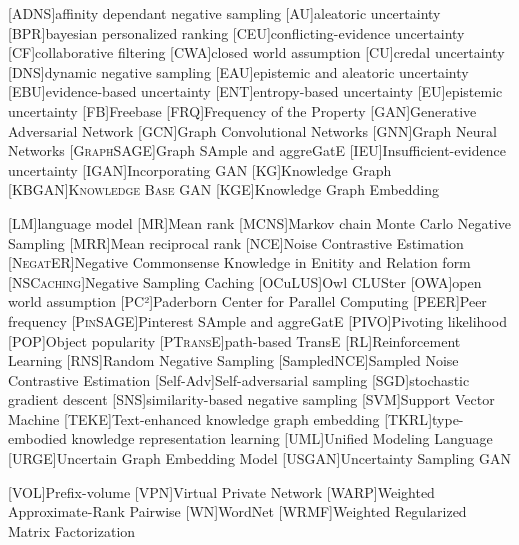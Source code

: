 \begin{acronym}[ECU]
[\textsc{ADNS}]{affinity dependant negative sampling}
[AU]{aleatoric uncertainty}
[BPR]{bayesian personalized ranking}
[CEU]{conflicting-evidence uncertainty}
[CF]{collaborative filtering}
[CWA]{closed world assumption}
[CU]{credal uncertainty}
[DNS]{dynamic negative sampling}
[EAU]{epistemic and aleatoric uncertainty}
[EBU]{evidence-based uncertainty}
[ENT]{entropy-based uncertainty}
[EU]{epistemic uncertainty}
[\textsc{FB}]{Freebase}
[\textsc{FRQ}]{Frequency of the Property}
[GAN]{Generative Adversarial Network}
[GCN]{Graph Convolutional Networks}
[GNN]{Graph Neural Networks}
[\textsc{GraphSAGE}]{Graph SAmple and aggreGatE}
[IEU]{Insufficient-evidence uncertainty}
[\textsc{IGAN}]{Incorporating GAN}
[KG]{Knowledge Graph}
[\textsc{KBGAN}]{\textsc{Knowledge Base GAN}}
[KGE]{Knowledge Graph Embedding}

[LM]{language model}
[MR]{Mean rank}
[\textsc{MCNS}]{Markov chain Monte Carlo Negative Sampling}
[MRR]{Mean reciprocal rank}
[NCE]{Noise Contrastive Estimation}
[\textsc{NegatER}]{Negative Commonsense Knowledge in Enitity and Relation form}
[\textsc{NSCaching}]{Negative Sampling Caching}
[OCuLUS]{Owl CLUSter}
[OWA]{open world assumption}
[PC²]{Paderborn Center for Parallel Computing}
[\textsc{PEER}]{Peer frequency}
[\textsc{PinSAGE}]{Pinterest SAmple and aggreGatE}
[\textsc{PIVO}]{Pivoting likelihood}
[\textsc{POP}]{Object popularity}
[\textsc{PTransE}]{path-based TransE}
[RL]{Reinforcement Learning}
[RNS]{Random Negative Sampling}
[SampledNCE]{Sampled Noise Contrastive Estimation}
[Self-Adv]{Self-adversarial sampling}
[SGD]{stochastic gradient descent}
[SNS]{similarity-based negative sampling}
[SVM]{Support Vector Machine}
[\textsc{TEKE}]{Text-enhanced knowledge graph embedding}
[\textsc{TKRL}]{type-embodied knowledge representation learning}
[UML]{Unified Modeling Language}
[\textsc{URGE}]{Uncertain Graph Embedding Model}
[\textsc{USGAN}]{Uncertainty Sampling GAN}

[\textsc{VOL}]{Prefix-volume}
[VPN]{Virtual Private Network}
[WARP]{Weighted Approximate-Rank Pairwise}
[\textsc{WN}]{WordNet}
[WRMF]{Weighted Regularized Matrix Factorization}
\end{acronym}